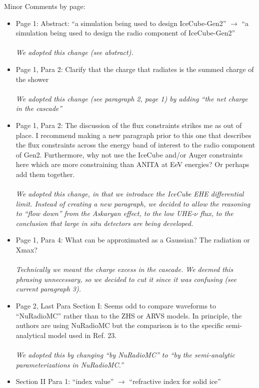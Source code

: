 \documentclass[12pt]{article}
\begin{document}
Minor Comments by page:
\begin{itemize}
\item Page 1: Abstract: ``a simulation being used to design IceCube-Gen2” $\rightarrow$ ``a
simulation being used to design the radio component of IceCube-Gen2'' \\ \\
\textit{We adopted this change (see abstract).}
\item Page 1, Para 2: Clarify that the charge that radiates is the summed charge of the shower \\ \\
\textit{We adopted this change (see paragraph 2, page 1) by adding ``the net charge in the cascade''}
\item Page 1, Para 2: The discussion of the flux constraints strikes me as out of place. I recommend making a new paragraph prior to this one that describes the flux constraints across the energy band of interest to the radio component of Gen2.  Furthermore, why not use the IceCube and/or Auger constraints here which are more constraining than ANITA at EeV energies? Or perhaps add them together. \\ \\
\textit{We adopted this change, in that we introduce the IceCube EHE differential limit.  Instead of creating a new paragraph, we decided to allow the reasoning to ``flow down'' from the Askaryan effect, to the low UHE-$\nu$ flux, to the conclusion that large in situ detectors are being developed.}
\item Page 1, Para 4: What can be approximated as a Gaussian? The radiation or Xmax? \\ \\
\textit{Technically we meant the charge excess in the cascade.  We deemed this phrasing unnecessary, so we decided to cut it since it was confusing (see current paragraph 3).}
\item Page 2, Last Para Section I: Seems odd to compare waveforms to ``NuRadioMC'' rather than to the ZHS or ARVS models. In principle, the authors are using NuRadioMC but the comparison is to the specific semi-analytical model used in Ref. 23. \\ \\
\textit{We adopted this by changing ``by NuRadioMC'' to ``by the semi-analytic parameterizations in NuRadioMC.''}
\item Section II Para 1: ``index value'' $\rightarrow$ ``refractive index for solid ice'' \\ \\

\end{itemize}
\end{document}
